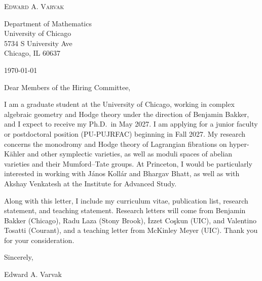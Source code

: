 \documentclass[12pt]{article}
\begin{document}
\begin{center}
  {\Large\textsc{Edward A. Varvak}}\\[10pt]
\end{center}

Department of Mathematics \\
University of Chicago \\
5734 S University Ave \\
Chicago, IL 60637

\today

Dear Members of the Hiring Committee,

I am a graduate student at the University of Chicago, working in complex
algebraic geometry and Hodge theory under the direction of Benjamin Bakker,
and I expect to receive my Ph.D.\ in May 2027. I am applying for a junior
faculty or postdoctoral position (\mbox{PU-PUJRFAC}) beginning in Fall 2027.
My research concerns the monodromy and Hodge theory of Lagrangian fibrations
on hyper-K\"ahler and other symplectic varieties, as well as moduli spaces of
abelian varieties and their Mumford--Tate groups. At Princeton, I would be
particularly interested in working with J\'anos Koll\'ar and Bhargav Bhatt, 
as well as with Akshay Venkatesh at the Institute for Advanced Study.

Along with this letter, I include my curriculum vitae, publication list,
research statement, and teaching statement. Research letters will come from
Benjamin Bakker (Chicago), Radu Laza (Stony Brook), \.{I}zzet Co\c{s}kun
(UIC), and Valentino Tosatti (Courant), and a teaching letter from McKinley
Meyer (UIC). Thank you for your consideration.

Sincerely,

Edward A. Varvak
\end{document}
